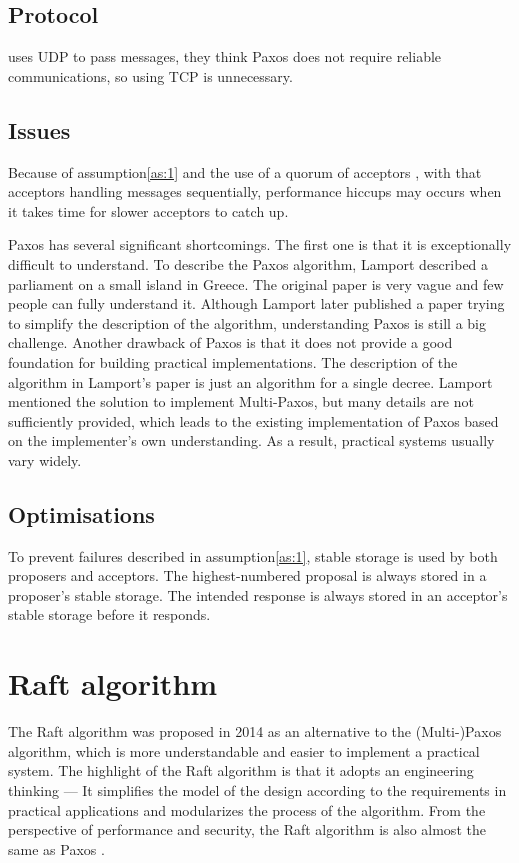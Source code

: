 \documentclass[12pt, a4paper]{article}
\begin{document}
\subsection{Protocol}
\cite{PaxosMadeSwitch-y} uses UDP to pass messages, 
they think Paxos does not require reliable communications, 
so using TCP is unnecessary.
\subsection{Issues}
Because of assumption\ref{as:1} and 
the use of a quorum of acceptors \cite{jalili2014practical}, 
with that acceptors handling messages sequentially,
performance hiccups may occurs when it takes time for slower acceptors 
to catch up.


Paxos has several significant shortcomings. The first one is that it 
is exceptionally difficult to understand\cite{conf/usenix/OngaroO14}. 
To describe the Paxos algorithm, Lamport described a parliament on a 
small island in Greece\cite{lamport1998part}. The original paper is 
very vague and few people can fully understand it. Although Lamport 
later published a paper trying to simplify the description of the 
algorithm\cite{lamport2001paxos}, understanding Paxos is still a big 
challenge. Another drawback of Paxos is that it does not provide a 
good foundation for building practical implementations\cite{conf/usenix/OngaroO14}.
The description of the algorithm in Lamport's paper is just an 
algorithm for a single decree. Lamport mentioned the solution to 
implement Multi-Paxos, but many details are not sufficiently provided, 
which leads to the existing implementation of Paxos based on the 
implementer's own understanding. As a result, practical systems usually
vary widely.

\subsection{Optimisations}
To prevent failures described in assumption\ref{as:1}, 
stable storage is used by both proposers and acceptors.
The highest-numbered proposal is always stored in a proposer's stable storage.
The intended response is always stored in an acceptor's stable storage
before it responds.

\section{Raft algorithm} \label{sec:raft}
The Raft algorithm was proposed in 2014\cite{conf/usenix/OngaroO14} as an alternative to the (Multi-)Paxos algorithm, which is more
understandable and easier to implement a practical system. The highlight of the Raft algorithm is that it adopts an
engineering thinking --- It simplifies the model of the design according to the requirements in practical applications and
modularizes the process of the algorithm. From the perspective of performance and security, the Raft algorithm is also almost
the same as Paxos \cite{conf/usenix/OngaroO14}.
\end{document}
